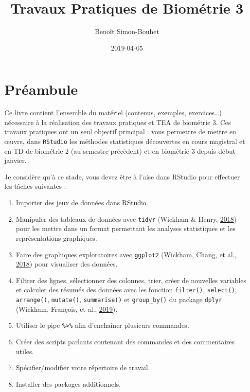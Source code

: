 \documentclass[a4paperpaper,]{article}
\title{Travaux Pratiques de Biométrie 3}
\author{Benoît Simon-Bouhet}
\date{2019-04-05}
\providecommand{\tightlist}{%
  \setlength{\itemsep}{0pt}\setlength{\parskip}{0pt}}
\begin{document}
\maketitle

{
\hypersetup{linkcolor=black}
\setcounter{tocdepth}{2}
\tableofcontents
}
\hypertarget{preambule}{%
\section{Préambule}\label{preambule}}

Ce livre contient l'ensemble du matériel (contenus, exemples, exercices\ldots{}) nécessaire à la réalisation des travaux pratiques et TEA de biométrie 3. Ces travaux pratiques ont un seul objectif principal : vous permettre de mettre en œuvre, dans \texttt{RStudio} les méthodes statistiques découvertes en cours magistral et en TD de biométrie 2 (au semestre précédent) et en biométrie 3 depuis début janvier.

Je considère qu'à ce stade, vous devez être à l'aise dans RStudio pour effectuer les tâches suivantes :

\begin{enumerate}
\def\labelenumi{\arabic{enumi}.}
\tightlist
\item
  Importer des jeux de données dans RStudio.
\item
  Manipuler des tableaux de données avec \texttt{tidyr} (Wickham \& Henry, \protect\hyperlink{ref-R-tidyr}{2018}) pour les mettre dans un format permettant les analyses statistiques et les représentations graphiques.
\item
  Faire des graphiques exploratoires avec \texttt{ggplot2} (Wickham, Chang, et al., \protect\hyperlink{ref-R-ggplot2}{2018}) pour visualiser des données.
\item
  Filtrer des lignes, sélectionner des colonnes, trier, créer de nouvelles variables et calculer des résumés des données avec les fonction \texttt{filter()}, \texttt{select()}, \texttt{arrange()}, \texttt{mutate()}, \texttt{summarise()} et \texttt{group\_by()} du package \texttt{dplyr} (Wickham, François, et al., \protect\hyperlink{ref-R-dplyr}{2019}).
\item
  Utiliser le pipe \texttt{\%\textgreater{}\%} afin d'enchaîner plusieurs commandes.
\item
  Créer des scripts parlants contenant des commandes et des commentaires utiles.
\item
  Spécifier/modifier votre répertoire de travail.
\item
  Installer des packages additionnels.
\end{enumerate}
\end{document}
